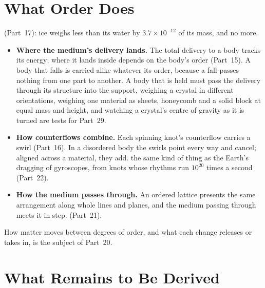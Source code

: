 \documentclass[11pt,a4paper]{article}
\begin{document}
\section{What Order Does}
\label{sec:order}

 (Part~17): ice weighs less than its water by $3.7\times10^{-12}$ of its mass, and no more. 
\begin{itemize}
\item \textbf{Where the medium's delivery lands.} The total delivery to a body tracks its energy; where it lands inside depends on the body's order (Part~15). A body that falls is carried alike whatever its order, because a fall passes nothing from one part to another. A body that is held must pass the delivery through its structure into the support,   weighing a crystal in different orientations, weighing one material as sheets, honeycomb and a solid block at equal mass and height, and watching a crystal's centre of gravity as it is turned are tests for Part~29.
\item \textbf{How counterflows combine.} Each spinning knot's counterflow carries a swirl (Part~16). In a disordered body the swirls point every way and cancel; aligned across a material, they add.  the same kind of thing as the Earth's dragging of gyroscopes, from knots whose rhythms run $10^{20}$ times a second (Part~22).
\item \textbf{How the medium passes through.} An ordered lattice presents the same arrangement along whole lines and planes, and the medium passing through meets it in step.  (Part~21).
\end{itemize}
How matter moves between degrees of order, and what each change releases or takes in, is the subject of Part~20.


\section{What Remains to Be Derived}
\label{sec:owed}
\end{document}
